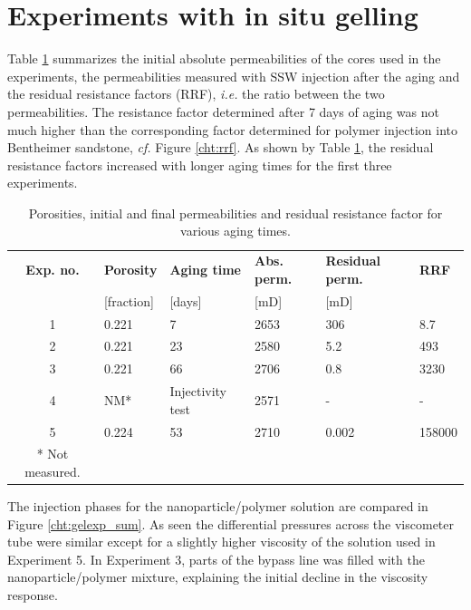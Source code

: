 \FloatBarrier
\section{Experiments with in situ gelling}
Table \ref{tab:porPermAge} summarizes the initial absolute permeabilities of the cores used in the experiments, the permeabilities measured with SSW injection after the aging and the residual resistance factors (RRF), \textit{i.e.} the ratio between the two permeabilities. The resistance factor determined after 7 days of aging was not much higher than the corresponding factor determined for polymer injection into Bentheimer sandstone, \textit{cf.} Figure \ref{cht:rrf}. As shown by Table \ref{tab:porPermAge}, the residual resistance factors increased with longer aging times for the first three experiments.
\begin{table}
\footnotesize
\centering
\caption{Porosities, initial and final permeabilities and residual resistance factor for various aging times.}
\label{tab:porPermAge} %
\begin{tabular}{c l l l l l } 
\toprule
\textbf{Exp. no.} & \textbf{Porosity} & \textbf{Aging time} & \textbf{Abs. perm.} & \textbf{Residual perm.} & \textbf{RRF} \\ 
 & [fraction] & [days] & [mD] & [mD] & \\
\midrule 
1  & 0.221   &  7     & 2653     & 306      & 8.7    \\
2  & 0.221   & 23     & 2580     & 5.2      & 493      \\ 
3  & 0.221   & 66     & 2706     & 0.8    & 3230   \\ 
4  & NM* & Injectivity test & 2571    & -        & -      \\
5  & 0.224   & 53     & 2710     & 0.002        & 158000      \\
\bottomrule
* Not measured.
\end{tabular}
\end{table}

The injection phases for the nanoparticle/polymer solution are compared in Figure \ref{cht:gelexp_sum}. As seen the differential pressures across the viscometer tube were similar except for a slightly higher viscosity of the solution used in Experiment 5. In Experiment 3, parts of the bypass line was filled with the nanoparticle/polymer mixture, explaining the initial decline in the viscosity response. 

